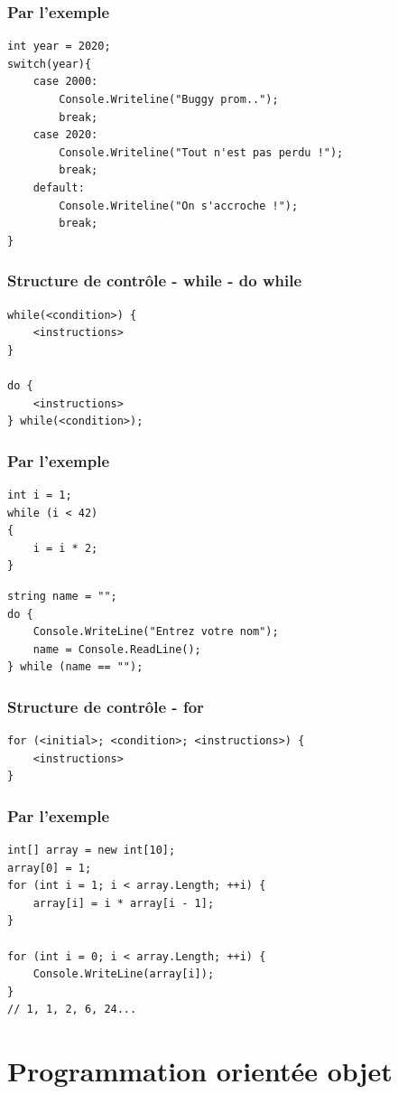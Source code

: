 \documentclass{beamer}
\begin{document}
\begin{frame}[fragile]
\frametitle{Par l'exemple}
\begin{lstlisting}
int year = 2020;
switch(year){
    case 2000:
        Console.Writeline("Buggy prom..");
        break;
    case 2020:
        Console.Writeline("Tout n'est pas perdu !");
        break;
    default:
        Console.Writeline("On s'accroche !");
        break;
}
\end{lstlisting}
\end{frame}

\begin{frame}[fragile]
\frametitle{Structure de contrôle - while - do while}
\begin{lstlisting}
while(<condition>) {
    <instructions>
}

do {
    <instructions>
} while(<condition>);
\end{lstlisting}
\end{frame}

\begin{frame}[fragile]
\frametitle{Par l'exemple}
\begin{lstlisting}
int i = 1;
while (i < 42)
{
    i = i * 2;
}
\end{lstlisting}
\begin{lstlisting}
string name = "";
do {
    Console.WriteLine("Entrez votre nom");
    name = Console.ReadLine();
} while (name == "");
\end{lstlisting}
\end{frame}

\begin{frame}[fragile]
\frametitle{Structure de contrôle - for}
\begin{lstlisting}
for (<initial>; <condition>; <instructions>) {
    <instructions>
}
\end{lstlisting}
\end{frame}

\begin{frame}[fragile]
\frametitle{Par l'exemple}
\begin{lstlisting}
int[] array = new int[10];
array[0] = 1;
for (int i = 1; i < array.Length; ++i) {
    array[i] = i * array[i - 1];
}

for (int i = 0; i < array.Length; ++i) {
    Console.WriteLine(array[i]);
}
// 1, 1, 2, 6, 24...
\end{lstlisting}
\end{frame}

\section{Programmation orientée objet}
\end{document}
